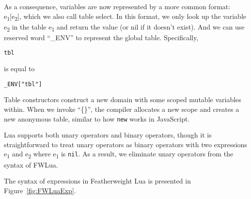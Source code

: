 As a consequence, variables are now represented by a more common format: e\textsubscript{1}[e\textsubscript{2}], which we also call table select. In this format, we only look up the variable e\textsubscript{2} in the table e\textsubscript{1} and return the value (or nil if it doesn't exist). And we can use reserved word ``\_ENV'' to represent the global table. Specifically,

\begin{verbatim}
tbl
\end{verbatim}
is equal to
\begin{verbatim}
_ENV["tbl"]
\end{verbatim}

Table constructors
construct a new domain with some scoped mutable variables within.
When we invoke ``\{\}'', the compiler allocates a new scope
and creates a new anonymous table, similar to how {\tt new} works in JavaScript.

Lua supports both
unary operators and binary operators, though it is straightforward to treat unary operators as binary operators
with two expressions e\textsubscript{1} and e\textsubscript{2} where e\textsubscript{1} is {\tt nil}.
As a result, we eliminate unary operators from the syntax of FWLua.


The syntax of expressions in Featherweight Lua is presented in Figure~\ref{fig:FWLuaExp}.


